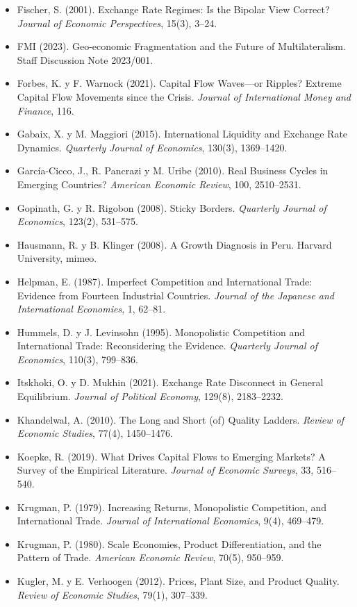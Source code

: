 \documentclass[11pt,a4paper]{article}
\begin{document}
{\begin{itemize}[leftmargin=1.4em,itemsep=1pt,label={}]
\item Fischer, S. (2001). Exchange Rate Regimes: Is the Bipolar View Correct? \emph{Journal of Economic Perspectives}, 15(3), 3--24.
\item FMI (2023). Geo-economic Fragmentation and the Future of Multilateralism. Staff Discussion Note 2023/001.
\item Forbes, K. y F. Warnock (2021). Capital Flow Waves---or Ripples? Extreme Capital Flow Movements since the Crisis. \emph{Journal of International Money and Finance}, 116.
\item Gabaix, X. y M. Maggiori (2015). International Liquidity and Exchange Rate Dynamics. \emph{Quarterly Journal of Economics}, 130(3), 1369--1420.
\item García-Cicco, J., R. Pancrazi y M. Uribe (2010). Real Business Cycles in Emerging Countries? \emph{American Economic Review}, 100, 2510--2531.
\item Gopinath, G. y R. Rigobon (2008). Sticky Borders. \emph{Quarterly Journal of Economics}, 123(2), 531--575.
\item Hausmann, R. y B. Klinger (2008). A Growth Diagnosis in Peru. Harvard University, mimeo.
\item Helpman, E. (1987). Imperfect Competition and International Trade: Evidence from Fourteen Industrial Countries. \emph{Journal of the Japanese and International Economies}, 1, 62--81.
\item Hummels, D. y J. Levinsohn (1995). Monopolistic Competition and International Trade: Reconsidering the Evidence. \emph{Quarterly Journal of Economics}, 110(3), 799--836.
\item Itskhoki, O. y D. Mukhin (2021). Exchange Rate Disconnect in General Equilibrium. \emph{Journal of Political Economy}, 129(8), 2183--2232.
\item Khandelwal, A. (2010). The Long and Short (of) Quality Ladders. \emph{Review of Economic Studies}, 77(4), 1450--1476.
\item Koepke, R. (2019). What Drives Capital Flows to Emerging Markets? A Survey of the Empirical Literature. \emph{Journal of Economic Surveys}, 33, 516--540.
\item Krugman, P. (1979). Increasing Returns, Monopolistic Competition, and International Trade. \emph{Journal of International Economics}, 9(4), 469--479.
\item Krugman, P. (1980). Scale Economies, Product Differentiation, and the Pattern of Trade. \emph{American Economic Review}, 70(5), 950--959.
\item Kugler, M. y E. Verhoogen (2012). Prices, Plant Size, and Product Quality. \emph{Review of Economic Studies}, 79(1), 307--339.

\end{itemize}}
\end{document}
